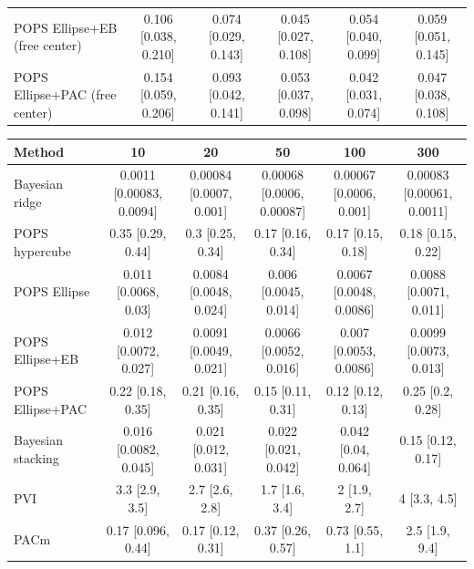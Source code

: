 \begin{tabular}{lccccc}
POPS Ellipse+EB (free center) & 0.106 {\scriptsize[0.038, 0.210]} & 0.074 {\scriptsize[0.029, 0.143]} & 0.045 {\scriptsize[0.027, 0.108]} & 0.054 {\scriptsize[0.040, 0.099]} & 0.059 {\scriptsize[0.051, 0.145]} \\
POPS Ellipse+PAC (free center) & 0.154 {\scriptsize[0.059, 0.206]} & 0.093 {\scriptsize[0.042, 0.141]} & 0.053 {\scriptsize[0.037, 0.098]} & 0.042 {\scriptsize[0.031, 0.074]} & 0.047 {\scriptsize[0.038, 0.108]} \\
\bottomrule
\end{tabular}

\begin{tabular}{lccccc}
\toprule
Method & 10 & 20 & 50 & 100 & 300 \\
\midrule
Bayesian ridge & 0.0011 {\scriptsize[0.00083, 0.0094]} & 0.00084 {\scriptsize[0.0007, 0.001]} & 0.00068 {\scriptsize[0.0006, 0.00087]} & 0.00067 {\scriptsize[0.0006, 0.001]} & 0.00083 {\scriptsize[0.00061, 0.0011]} \\
POPS hypercube & 0.35 {\scriptsize[0.29, 0.44]} & 0.3 {\scriptsize[0.25, 0.34]} & 0.17 {\scriptsize[0.16, 0.34]} & 0.17 {\scriptsize[0.15, 0.18]} & 0.18 {\scriptsize[0.15, 0.22]} \\
POPS Ellipse & 0.011 {\scriptsize[0.0068, 0.03]} & 0.0084 {\scriptsize[0.0048, 0.024]} & 0.006 {\scriptsize[0.0045, 0.014]} & 0.0067 {\scriptsize[0.0048, 0.0086]} & 0.0088 {\scriptsize[0.0071, 0.011]} \\
POPS Ellipse+EB & 0.012 {\scriptsize[0.0072, 0.027]} & 0.0091 {\scriptsize[0.0049, 0.021]} & 0.0066 {\scriptsize[0.0052, 0.016]} & 0.007 {\scriptsize[0.0053, 0.0086]} & 0.0099 {\scriptsize[0.0073, 0.013]} \\
POPS Ellipse+PAC & 0.22 {\scriptsize[0.18, 0.35]} & 0.21 {\scriptsize[0.16, 0.35]} & 0.15 {\scriptsize[0.11, 0.31]} & 0.12 {\scriptsize[0.12, 0.13]} & 0.25 {\scriptsize[0.2, 0.28]} \\
Bayesian stacking & 0.016 {\scriptsize[0.0082, 0.045]} & 0.021 {\scriptsize[0.012, 0.031]} & 0.022 {\scriptsize[0.021, 0.042]} & 0.042 {\scriptsize[0.04, 0.064]} & 0.15 {\scriptsize[0.12, 0.17]} \\
PVI & 3.3 {\scriptsize[2.9, 3.5]} & 2.7 {\scriptsize[2.6, 2.8]} & 1.7 {\scriptsize[1.6, 3.4]} & 2 {\scriptsize[1.9, 2.7]} & 4 {\scriptsize[3.3, 4.5]} \\
PACm & 0.17 {\scriptsize[0.096, 0.44]} & 0.17 {\scriptsize[0.12, 0.31]} & 0.37 {\scriptsize[0.26, 0.57]} & 0.73 {\scriptsize[0.55, 1.1]} & 2.5 {\scriptsize[1.9, 9.4]} \\

\end{tabular}
